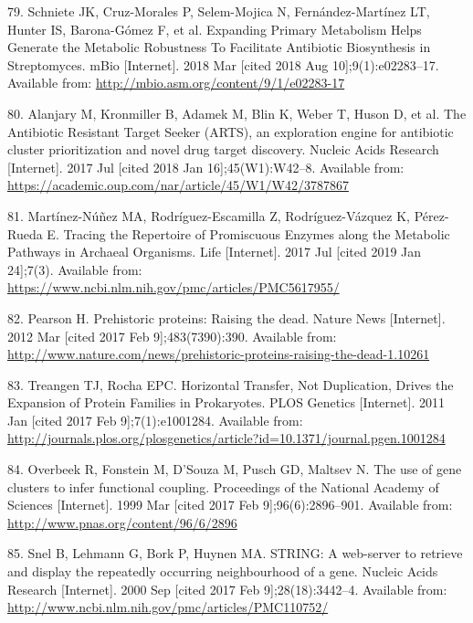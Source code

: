 \documentclass[12pt,twoside]{reedthesis}
\begin{document}
  \hypertarget{ref-schniete_expanding_2018}{}
  79. Schniete JK, Cruz-Morales P, Selem-Mojica N, Fernández-Martínez LT,
  Hunter IS, Barona-Gómez F, et al. Expanding Primary Metabolism Helps
  Generate the Metabolic Robustness To Facilitate Antibiotic Biosynthesis
  in Streptomyces. mBio {[}Internet{]}. 2018 Mar {[}cited 2018 Aug
  10{]};9(1):e02283--17. Available from:
  \url{http://mbio.asm.org/content/9/1/e02283-17}
  
  \hypertarget{ref-alanjary_antibiotic_2017}{}
  80. Alanjary M, Kronmiller B, Adamek M, Blin K, Weber T, Huson D, et al.
  The Antibiotic Resistant Target Seeker (ARTS), an exploration engine for
  antibiotic cluster prioritization and novel drug target discovery.
  Nucleic Acids Research {[}Internet{]}. 2017 Jul {[}cited 2018 Jan
  16{]};45(W1):W42--8. Available from:
  \url{https://academic.oup.com/nar/article/45/W1/W42/3787867}
  
  \hypertarget{ref-martinez-nunez_promiscuity_Archaea_2017}{}
  81. Martínez-Núñez MA, Rodríguez-Escamilla Z, Rodríguez-Vázquez K,
  Pérez-Rueda E. Tracing the Repertoire of Promiscuous Enzymes along the
  Metabolic Pathways in Archaeal Organisms. Life {[}Internet{]}. 2017 Jul
  {[}cited 2019 Jan 24{]};7(3). Available from:
  \url{https://www.ncbi.nlm.nih.gov/pmc/articles/PMC5617955/}
  
  \hypertarget{ref-pearson_prehistoric_2012}{}
  82. Pearson H. Prehistoric proteins: Raising the dead. Nature News
  {[}Internet{]}. 2012 Mar {[}cited 2017 Feb 9{]};483(7390):390. Available
  from:
  \url{http://www.nature.com/news/prehistoric-proteins-raising-the-dead-1.10261}
  
  \hypertarget{ref-treangen_horizontal_2011}{}
  83. Treangen TJ, Rocha EPC. Horizontal Transfer, Not Duplication, Drives
  the Expansion of Protein Families in Prokaryotes. PLOS Genetics
  {[}Internet{]}. 2011 Jan {[}cited 2017 Feb 9{]};7(1):e1001284. Available
  from:
  \url{http://journals.plos.org/plosgenetics/article?id=10.1371/journal.pgen.1001284}
  
  \hypertarget{ref-overbeek_use_1999}{}
  84. Overbeek R, Fonstein M, D'Souza M, Pusch GD, Maltsev N. The use of
  gene clusters to infer functional coupling. Proceedings of the National
  Academy of Sciences {[}Internet{]}. 1999 Mar {[}cited 2017 Feb
  9{]};96(6):2896--901. Available from:
  \url{http://www.pnas.org/content/96/6/2896}
  
  \hypertarget{ref-snel_string_2000}{}
  85. Snel B, Lehmann G, Bork P, Huynen MA. STRING: A web-server to
  retrieve and display the repeatedly occurring neighbourhood of a gene.
  Nucleic Acids Research {[}Internet{]}. 2000 Sep {[}cited 2017 Feb
  9{]};28(18):3442--4. Available from:
  \url{http://www.ncbi.nlm.nih.gov/pmc/articles/PMC110752/}
  
\end{document}
